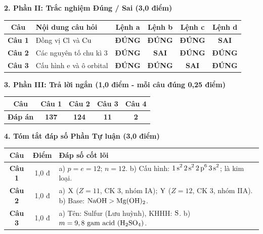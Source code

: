 \documentclass[11pt,a4paper]{article}
\begin{document}
\vspace{2pt}
\noindent
\textbf{\color{mainGreen}2. Phần II: Trắc nghiệm Đúng / Sai (3,0 điểm)}
\begin{center}
\renewcommand{\arraystretch}{1.2}
\begin{tabular}{|c|l|c|c|c|c|}
\hline
\rowcolor{tableGreen}
\textbf{Câu} & \textbf{Nội dung câu hỏi} & \textbf{Lệnh a} & \textbf{Lệnh b} & \textbf{Lệnh c} & \textbf{Lệnh d} \\
\hline
\textbf{Câu 1} & Đồng vị $\ce{Cl}$ và $\ce{Cu}$ & \textbf{\color{hfRed}ĐÚNG} & \textbf{\color{hfRed}ĐÚNG} & \textbf{\color{hfRed}ĐÚNG} & \textbf{SAI} \\
\hline
\textbf{Câu 2} & Các nguyên tố chu kì 3 & \textbf{\color{hfRed}ĐÚNG} & \textbf{SAI} & \textbf{\color{hfRed}ĐÚNG} & \textbf{\color{hfRed}ĐÚNG} \\
\hline
\textbf{Câu 3} & Cấu hình e và ô orbital & \textbf{\color{hfRed}ĐÚNG} & \textbf{\color{hfRed}ĐÚNG} & \textbf{SAI} & \textbf{\color{hfRed}ĐÚNG} \\
\hline
\end{tabular}
\end{center}

\vspace{2pt}
\noindent
\textbf{\color{mainGreen}3. Phần III: Trả lời ngắn (1,0 điểm - mỗi câu đúng 0,25 điểm)}
\begin{center}
\renewcommand{\arraystretch}{1.2}
\begin{tabular}{|c|c|c|c|c|}
\hline
\rowcolor{tableGreen}
\textbf{Câu} & \textbf{Câu 1} & \textbf{Câu 2} & \textbf{Câu 3} & \textbf{Câu 4} \\
\hline
\textbf{Đáp án} & \textbf{\color{hfRed}137} & \textbf{\color{hfRed}124} & \textbf{\color{hfRed}11} & \textbf{\color{hfRed}2} \\
\hline
\end{tabular}
\end{center}

\vspace{2pt}
\noindent
\textbf{\color{mainGreen}4. Tóm tắt đáp số Phần Tự luận (3,0 điểm)}
\begin{center}
\renewcommand{\arraystretch}{1.2}
\begin{tabular}{|c|c|p{11.5cm}|}
\hline
\rowcolor{tableGreen}
\textbf{Câu} & \textbf{Điểm} & \textbf{Đáp số cốt lõi} \\
\hline
\textbf{Câu 1} & 1,0 đ & a) $p = e = 12$; $n = 12$. \quad b) Cấu hình: $\ce{1s^2 2s^2 2p^6 3s^2}$; là kim loại. \\
\hline
\textbf{Câu 2} & 1,0 đ & a) $\ce{X}$ ($Z = 11$, CK 3, nhóm IA); $\ce{Y}$ ($Z = 12$, CK 3, nhóm IIA). \quad b) Base: $\ce{NaOH} > \ce{Mg(OH)2}$. \\
\hline
\textbf{Câu 3} & 1,0 đ & a) Tên: Sulfur (Lưu huỳnh), KHHH: $\ce{S}$. \quad b) $m = 9,8\text{ gam acid } (\ce{H2SO4})$. \\
\hline
\end{tabular}
\end{center}
\end{document}
